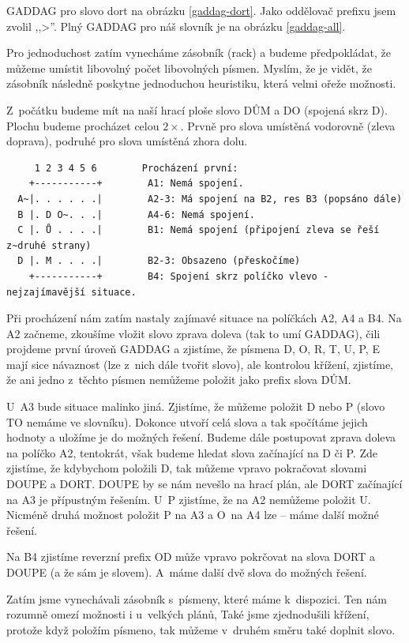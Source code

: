 \documentclass[a4paper]{article}
\begin{document}
GADDAG pro slovo dort na obrázku \ref{gaddag-dort}. Jako oddělovač prefixu jsem zvolil ,,>''. Plný GADDAG pro náš slovník je na obrázku \ref{gaddag-all}.  


Pro jednoduchost zatím vynecháme zásobník (rack) a budeme předpokládat, že můžeme umístit libovolný počet libovolných písmen. Myslím, že je vidět, že zásobník následně poskytne jednoduchou heuristiku, která velmi ořeže možnosti.

Z~počátku budeme mít na naší hrací ploše slovo DŮM a DO (spojená skrz D). Plochu budeme procházet celou $2\times$. Prvně pro slova umístěná vodorovně (zleva doprava), podruhé pro slova umístěná zhora dolu.
\clearpage
\begin{verbatim}
     1 2 3 4 5 6        Procházení první:
    +-----------+        A1: Nemá spojení.
  A~|. . . . . .|        A2-3: Má spojení na B2, res B3 (popsáno dále)
  B |. D O~. . .|        A4-6: Nemá spojení.
  C |. Ů . . . .|        B1: Nemá spojení (připojení zleva se řeší z~druhé strany)
  D |. M . . . .|        B2-3: Obsazeno (přeskočíme)
    +-----------+        B4: Spojení skrz políčko vlevo - nejzajímavější situace.
\end{verbatim}
Při procházení nám zatím nastaly zajímavé situace na políčkách A2, A4 a B4. Na A2 začneme, zkoušíme vložit slovo zprava doleva (tak to umí GADDAG), čili projdeme první úroveň GADDAG a zjistíme, že písmena D, O, R, T, U, P, E mají sice návaznost (lze z~nich dále tvořit slovo), ale kontrolou křížení, zjistíme,  že ani jedno z~těchto písmen nemůžeme položit jako prefix slova DŮM.

U~A3 bude situace malinko jiná. Zjistíme, že můžeme položit D nebo P (slovo TO nemáme ve slovníku). Dokonce utvoří celá slova a tak spočítáme jejich hodnoty a uložíme je do možných řešení. Budeme dále postupovat zprava doleva na políčko A2, tentokrát, však budeme hledat slova začínající na D či P. Zde zjistíme, že kdybychom položili D, tak můžeme vpravo pokračovat slovami DOUPE a DORT. DOUPE by se nám nevešlo na hrací plán, ale DORT začínající na A3 je přípustným řešením. U~P zjistíme, že na A2 nemůžeme položit U. Nicméně druhá možnost položit P na A3 a O~na A4 lze -- máme další možné řešení.

Na B4 zjistíme reverzní prefix OD může vpravo pokrčovat na slova DORT a DOUPE (a že sám je slovem). A~máme další dvě slova do možných řešení. 

Zatím jsme vynechávali zásobník s~písmeny, které máme k~dispozici. Ten nám rozumně omezí možnosti i u~velkých plánů, Také jsme zjednodušili křížení, protože když položím písmeno, tak můžeme v~druhém směru také doplnit slovo.
\end{document}
